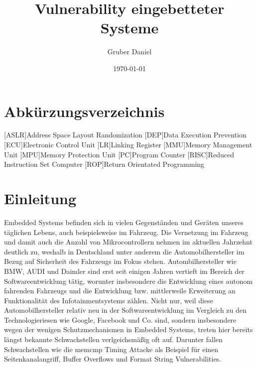 \documentclass[a4paper,
DIV=13,
12pt,
BCOR=10mm,
department=FakIM,
oneside,
parskip=half,
automark,
listof=totocnumbered,
bibliography=totocnumbered,
acronym=totocnumbered
] {OTHRartcl}
\date{\today}
\title{Vulnerability eingebetteter Systeme}
\author{Gruber Daniel}
\begin{document}
\maketitle

\tableofcontents
\newpage

\section*{Abkürzungsverzeichnis}
\label{abkuerzungsverzeichnis}
\begin{acronym}[AUTOSAR]
  [ASLR]{Address Space Layout Randomization}
  [DEP]{Data Execution Prevention}
  [ECU]{Electronic Control Unit}
  [LR]{Linking Register}
  [MMU]{Memory Management Unit}
  [MPU]{Memory Protection Unit}
  [PC]{Program Counter}
  [RISC]{Reduced Instruction Set Computer}
  [ROP]{Return Orientated Programming}
\end{acronym}
\newpage

\section{Einleitung}
\label{sec:Einleitung}
Embedded Systems befinden sich in vielen Gegenständen und Geräten unseres täglichen Lebens, auch beispielsweise im Fahrzeug.
Die Vernetzung im Fahrzeug und damit auch die Anzahl von Mikrocontrollern nehmen im aktuellen Jahrzehnt deutlich zu, weshalb in Deutschland unter anderem die Automobilhersteller im Bezug auf Sicherheit des Fahrzeugs im Fokus stehen.
Autombilhersteller wie BMW, AUDI und Daimler sind erst seit einigen Jahren vertieft im Bereich der Softwareentwicklung tätig, worunter insbesondere die Entwicklung eines autonom fahrenden Fahrzeugs und die Entwicklung
bzw. mittlerweile Erweiterung an Funktionalität des Infotainmentsystems zählen. Nicht nur, weil diese Automobilhersteller relativ neu in der Softwareentwicklung im Vergleich zu den Technologieriesen wie Google, Facebook und Co.
sind, sondern insbesondere wegen der wenigen Schutzmechanismen in Embedded Systems, treten hier bereits längst bekannte Schwachstellen verlgeichsmäßig oft auf.
Darunter fallen Schwachstellen wie die memcmp Timing Attacke als Beispiel für einen Seitenkanalangriff, Buffer Overflows und Format String Vulnerabilities. \cite{car format string vuln.}
\end{document}
